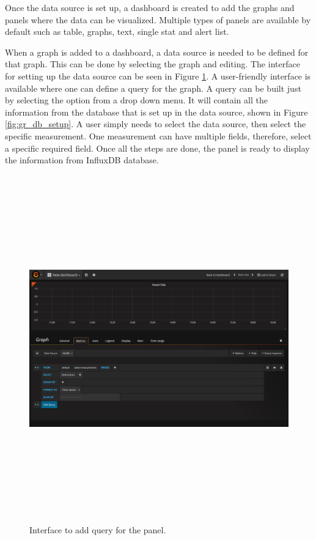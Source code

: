 Once the data source is set up, a dashboard is created to add the graphs and panels where the data can be visualized. Multiple types of panels are available by default such as table, graphs, text, single stat and alert list.

When a graph is added to a dashboard, a data source is needed to be defined for that graph. This can be done by selecting the graph and editing. The interface for setting up the data source can be seen in Figure \ref{fig:gr_query}. A user-friendly interface is available where one can define a query for the graph. A query can be built just by selecting the option from a drop down menu. It will contain all the information from the database that is set up in the data source, shown in Figure \ref{fig:gr_db_setup}. A user simply needs to select the data source, then select the specific measurement. One measurement can have multiple fields, therefore, select a specific required field. Once all the steps are done, the panel is ready to display the information from InfluxDB database.


\begin{figure}[htpb]
	\centering
	\includegraphics[width=16cm,height=15cm,keepaspectratio=true]{images/gr_query}
	\caption{
		Interface to add query for the panel.
	}
	\label{fig:gr_query}
\end{figure}


